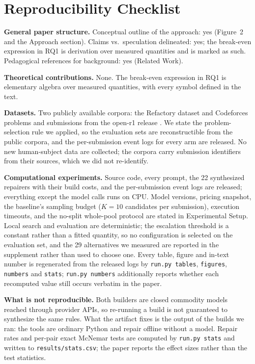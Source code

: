 \section*{Reproducibility Checklist}
\noindent\textbf{General paper structure.} Conceptual outline of the approach: yes (Figure~2 and the Approach section). Claims vs.\ speculation delineated: yes; the break-even expression in RQ1 is derivation over measured quantities and is marked as such. Pedagogical references for background: yes (Related Work).

\smallskip
\noindent\textbf{Theoretical contributions.} None. The break-even expression in RQ1 is elementary algebra over measured quantities, with every symbol defined in the text.

\smallskip
\noindent\textbf{Datasets.} Two publicly available corpora: the Refactory dataset \citep{refactory2019} and Codeforces problems and submissions from the open-r1 release \citep{penedo2025codeforces}. We state the problem-selection rule we applied, so the evaluation sets are reconstructible from the public corpora, and the per-submission event logs for every arm are released. No new human-subject data are collected; the corpora carry submission identifiers from their sources, which we did not re-identify.

\smallskip
\noindent\textbf{Computational experiments.} Source code, every prompt, the 22 synthesized repairers with their build costs, and the per-submission event logs are released; everything except the model calls runs on CPU. Model versions, pricing snapshot, the baseline's sampling budget ($K{=}10$ candidates per submission), execution timeouts, and the no-split whole-pool protocol are stated in Experimental Setup. Local search and evaluation are deterministic; the escalation threshold is a constant rather than a fitted quantity, so no configuration is selected on the evaluation set, and the 29 alternatives we measured are reported in the supplement rather than used to choose one. Every table, figure and in-text number is regenerated from the released logs by \texttt{run.py tables}, \texttt{figures}, \texttt{numbers} and \texttt{stats}; \texttt{run.py numbers} additionally reports whether each recomputed value still occurs verbatim in the paper.

\smallskip
\noindent\textbf{What is not reproducible.} Both builders are closed commodity models reached through provider APIs, so re-running a build is not guaranteed to synthesize the same rules. What the artifact fixes is the output of the builds we ran: the tools are ordinary Python and repair offline without a model. Repair rates and per-pair exact McNemar tests are computed by \texttt{run.py stats} and written to \texttt{results/stats.csv}; the paper reports the effect sizes rather than the test statistics.
